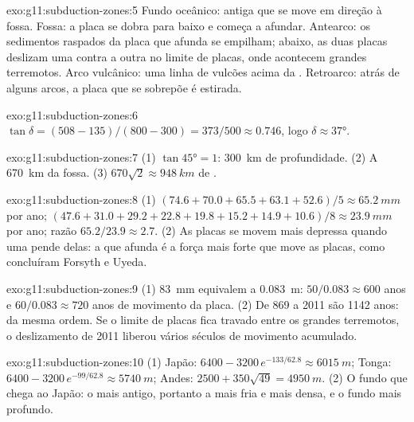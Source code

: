 \begin{solution}{exo:g11:subduction-zones:5}
Fundo oceânico:  antiga que se move em direção à fossa. Fossa: a
placa se dobra para baixo e começa a afundar. Antearco: os sedimentos
raspados da placa que afunda se empilham; abaixo, as duas placas deslizam
uma contra a outra no limite de placas, onde acontecem grandes terremotos.
Arco vulcânico: uma linha de vulcões acima da . Retroarco: atrás de
alguns arcos, a placa que se sobrepõe é estirada.
\end{solution}

\begin{solution}{exo:g11:subduction-zones:6}
$\tan\delta = (508 - 135)/(800 - 300) = 373/500 \approx 0.746$, logo
$\delta \approx \ang{37}$.
\end{solution}

\begin{solution}{exo:g11:subduction-zones:7}
(1) $\tan\ang{45} = 1$: \qty{300}{km} de profundidade. (2) A \qty{670}{km}
da fossa. (3) $670\sqrt{2} \approx \qty{948}{km}$ de .
\end{solution}

\begin{solution}{exo:g11:subduction-zones:8}
(1) $(74.6 + 70.0 + 65.5 + 63.1 + 52.6)/5 \approx \qty{65.2}{mm}$ por ano;
$(47.6 + 31.0 + 29.2 + 22.8 + 19.8 + 15.2 + 14.9 + 10.6)/8 \approx
\qty{23.9}{mm}$ por ano; razão $65.2/23.9 \approx 2.7$. (2) As placas se
movem mais depressa quando uma  pende delas: a  que afunda
é a força mais forte que move as placas, como concluíram Forsyth e Uyeda.
\end{solution}

\begin{solution}{exo:g11:subduction-zones:9}
(1) \qty{83}{mm} equivalem a \qty{0.083}{m}: $50/0.083 \approx 600$ anos e
$60/0.083 \approx 720$ anos de movimento da placa. (2) De 869 a 2011 são
1142 anos: da mesma ordem. Se o limite de placas fica travado entre os
grandes terremotos, o deslizamento de 2011 liberou vários séculos de
movimento acumulado.
\end{solution}

\begin{solution}{exo:g11:subduction-zones:10}
(1) Japão: $6400 - 3200\,e^{-133/62.8} \approx \qty{6015}{m}$; Tonga:
$6400 - 3200\,e^{-99/62.8} \approx \qty{5740}{m}$; Andes:
$2500 + 350\sqrt{49} = \qty{4950}{m}$. (2) O fundo que chega ao Japão: o
mais antigo, portanto a  mais fria e mais densa, e o fundo mais
profundo.
\end{solution}

